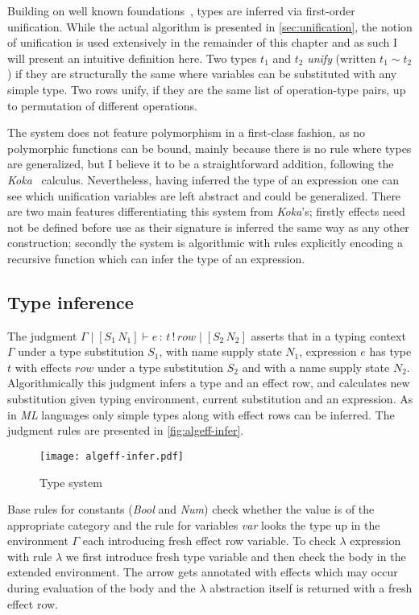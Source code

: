 \documentclass[inz, english, longabstract]{iithesis}
\begin{document}
Building on well known foundations~\cite{Pierce2002}, types are inferred via first-order unification.
While the actual algorithm is presented in \autoref{sec:unification}, the notion of unification is used extensively in the remainder of this chapter and as such I will present an intuitive definition here.
Two types $t_1$ and $t_2$ \emph{unify} (written $t_1 \sim t_2$) if they are structurally the same where variables can be substituted with any simple type.
Two rows unify, if they are the same list of operation-type pairs, up to permutation of different operations.

The system does not feature polymorphism in a first-class fashion, as no polymorphic functions can be bound, mainly because there is no rule where types are generalized, but I believe it to be a straightforward addition, following the \emph{Koka}~\cite{Leijen2014} calculus.
Nevertheless, having inferred the type of an expression one can see which unification variables are left abstract and could be generalized.
There are two main features differentiating this system from \emph{Koka}'s; firstly effects need not be defined before use as their signature is inferred the same way as any other construction; secondly the system is algorithmic with rules explicitly encoding a recursive function which can infer the type of an expression.

\subsection{Type inference}
The judgment $ \Gamma \mid [S_1 \, N_1] \vdash e \, : \, t \, ! \, row \mid [S_2 \, N_2] $ asserts that in a typing context $ \Gamma $ under a type substitution $ S_1 $, with name supply state $ N_1 $, expression $ e $ has type $ t $ with effects $ row $ under a type substitution $ S_2 $ and with a name supply state $ N_2 $.
Algorithmically this judgment infers a type and an effect row, and calculates new substitution given typing environment, current substitution and an expression.
As in \emph{ML} languages only simple types along with effect rows can be inferred.
The judgment rules are presented in \autoref{fig:algeff-infer}.

\begin{figure}
  \centering
  \texttt{[image: algeff-infer.pdf]}
  \caption{Type system} 
  \label{fig:algeff-infer} 
\end{figure}

Base rules for constants (\emph{Bool} and \emph{Num}) check whether the value is of the appropriate category and the rule for variables \emph{var} looks the type up in the environment $\Gamma$ each introducing fresh effect row variable.
To check $ \lambda $ expression with rule $\lambda$ we first introduce fresh type variable and then check the body in the extended environment.
The arrow gets annotated with effects which may occur during evaluation of the body and the $ \lambda $ abstraction itself is returned with a fresh effect row.
\end{document}
